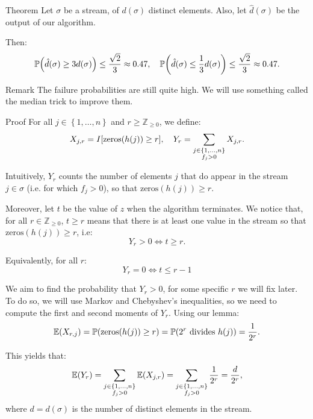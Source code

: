 \documentclass[a4paper]{article}
\begin{document}
\begin{parag}{Theorem}
    Let $\sigma$ be a stream, of $d\left(\sigma\right)$ distinct elements. Also, let $\hat{d}\left(\sigma\right)$ be the output of our algorithm.

    Then:
    \[\prob\left(\hat{d}\left(\sigma\right) \geq 3 d\left(\sigma\right)\right) \leq \frac{\sqrt{2}}{3} \approx 0.47, \mathspace \prob\left(\hat{d}\left(\sigma\right) \leq \frac{1}{3} d\left(\sigma\right)\right) \leq \frac{\sqrt{2}}{3} \approx 0.47.\]

    \begin{subparag}{Remark}
        The failure probabilities are still quite high. We will use something called the median trick to improve them.
    \end{subparag}

    \begin{subparag}{Proof}
        For all $j \in \left\{1, \ldots, n\right\}$ and $r \geq \mathbb{Z}_{\geq 0}$, we define: 
        \[X_{j, r} = I\left[\text{zeros}\left(h\left(j\right)\right) \geq r\right], \mathspace Y_r = \sum_{\substack{j \in \left\{1, \ldots, n\right\} \\ f_j > 0}} X_{j, r}.\]

        Intuitively, $Y_r$ counts the number of elements $j$ that do appear in the stream $j \in \sigma$ (i.e. for which $f_j > 0$), so that $\text{zeros}\left(h\left(j\right)\right) \geq r$.

        Moreover, let $t$ be the value of $z$ when the algorithm terminates. We notice that, for all $r \in \mathbb{Z}_{\geq 0}$, $t \geq r$ means that there is at least one value in the stream so that $\text{zeros}\left(h\left(j\right)\right) \geq r$, i.e:
        \[Y_r > 0 \iff t \geq r.\]

        Equivalently, for all $r$: 
        \[Y_r = 0 \iff t \leq r-1\]
        
        We aim to find the probability that $Y_r > 0$, for some specific $r$ we will fix later. To do so, we will use Markov and Chebyshev's inequalities, so we need to compute the first and second moments of $Y_r$. Using our lemma:
        \[\exval\left(X_{r, j}\right) = \prob\left(\text{zeros}\left(h\left(j\right)\right) \geq r\right) = \prob\left(\text{$2^r$ divides $h\left(j\right)$}\right) = \frac{1}{2^r}.\]

        This yields that:
        \[\exval\left(Y_r\right) = \sum_{\substack{j \in \left\{1, \ldots, n\right\} \\ f_j > 0}} \exval\left(X_{j, r}\right) = \sum_{\substack{j \in \left\{1, \ldots, n\right\} \\ f_j > 0}} \frac{1}{2^r} = \frac{d}{2^r},\]
        where $d = d\left(\sigma\right)$ is the number of distinct elements in the stream.


\end{subparag}
\end{parag}
\end{document}
